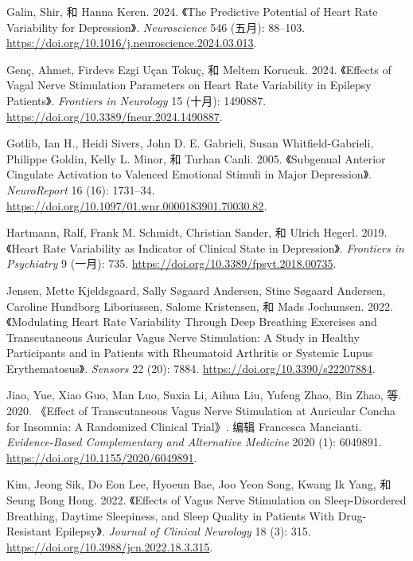 \documentclass[
  Letterpaper,
]{scrbook}
\newlength{\cslhangindent}
\newenvironment{CSLReferences}[2] %
 {\begin{list}{}{%
  \setlength{\itemindent}{0pt}
  \setlength{\leftmargin}{0pt}
  \setlength{\parsep}{0pt}
  \ifodd #1
   \setlength{\leftmargin}{\cslhangindent}
   \setlength{\itemindent}{-1\cslhangindent}
  \fi
  \setlength{\itemsep}{#2\baselineskip}}}
 {\end{list}}
\begin{document}
\begin{CSLReferences}{1}{0}
Galin, Shir, 和 Hanna Keren. 2024. {《The {Predictive Potential} of
{Heart Rate Variability} for {Depression}》}. \emph{Neuroscience} 546
(五月): 88--103.
\url{https://doi.org/10.1016/j.neuroscience.2024.03.013}.

Genç, Ahmet, Firdevs Ezgi Uçan Tokuç, 和 Meltem Korucuk. 2024.
{《Effects of Vagal Nerve Stimulation Parameters on Heart Rate
Variability in Epilepsy Patients》}. \emph{Frontiers in Neurology} 15
(十月): 1490887. \url{https://doi.org/10.3389/fneur.2024.1490887}.

Gotlib, Ian H., Heidi Sivers, John D. E. Gabrieli, Susan
Whitfield-Gabrieli, Philippe Goldin, Kelly L. Minor, 和 Turhan Canli.
2005. {《Subgenual Anterior Cingulate Activation to Valenced Emotional
Stimuli in Major Depression》}. \emph{NeuroReport} 16 (16): 1731--34.
\url{https://doi.org/10.1097/01.wnr.0000183901.70030.82}.

Hartmann, Ralf, Frank M. Schmidt, Christian Sander, 和 Ulrich Hegerl.
2019. {《Heart {Rate Variability} as {Indicator} of {Clinical State} in
{Depression}》}. \emph{Frontiers in Psychiatry} 9 (一月): 735.
\url{https://doi.org/10.3389/fpsyt.2018.00735}.

Jensen, Mette Kjeldsgaard, Sally Søgaard Andersen, Stine Søgaard
Andersen, Caroline Hundborg Liboriussen, Salome Kristensen, 和 Mads
Jochumsen. 2022. {《Modulating {Heart Rate Variability} Through {Deep
Breathing Exercises} and {Transcutaneous Auricular Vagus Nerve
Stimulation}: {A Study} in {Healthy Participants} and in {Patients} with
{Rheumatoid Arthritis} or {Systemic Lupus Erythematosus}》}.
\emph{Sensors} 22 (20): 7884. \url{https://doi.org/10.3390/s22207884}.

Jiao, Yue, Xiao Guo, Man Luo, Suxia Li, Aihua Liu, Yufeng Zhao, Bin
Zhao, 等. 2020. {《Effect of {Transcutaneous Vagus Nerve Stimulation} at
{Auricular Concha} for {Insomnia}: {A Randomized Clinical Trial}》}.
编辑 Francesca Mancianti. \emph{Evidence-Based Complementary and
Alternative Medicine} 2020 (1): 6049891.
\url{https://doi.org/10.1155/2020/6049891}.

Kim, Jeong Sik, Do Eon Lee, Hyoeun Bae, Joo Yeon Song, Kwang Ik Yang, 和
Seung Bong Hong. 2022. {《Effects of {Vagus Nerve Stimulation} on
{Sleep-Disordered Breathing}, {Daytime Sleepiness}, and {Sleep Quality}
in {Patients With Drug-Resistant Epilepsy}》}. \emph{Journal of Clinical
Neurology} 18 (3): 315. \url{https://doi.org/10.3988/jcn.2022.18.3.315}.


\end{CSLReferences}
\end{document}
